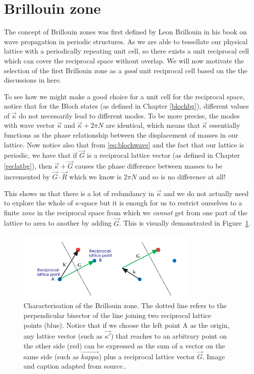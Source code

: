 \section{Brillouin zone}
\label{brizones}

The concept of Brillouin zones was first defined by Leon Brillouin in his book
on wave propagation in periodic structures.\cite{brillouin} As we are able to
tessellate our physical lattice with a periodically repeating unit cell, so
there exists a unit reciprocal cell which can cover the reciprocal space
without overlap. We will now motivate the selection of the first Brillouin zone
as a \textit{good} unit reciprocal cell based on the the discussions in
here.\cite{moldinglight}

To see how we might make a good choice for a unit cell for the reciprocal
space, notice that for the Bloch states (as defined in Chapter \ref{blochbg}),
different values of $\vec{\kappa}$ do not necessarily lead to different modes.
To be more precise, the modes with wave vector $\vec{\kappa}$ and
$\vec{\kappa}+2\pi N$ are identical, which means that $\vec{\kappa}$
essentially functions as the phase relationship between the displacement of
masses in our lattice. Now notice also that from \eqref{eq:blochwave} and the
fact that our lattice is periodic, we have that if $\vec{G}$ is a reciprocal
lattice vector (as defined in Chapter \ref{reclatbg}), then
$\vec{\kappa}+\vec{G}$ causes the phase difference between masses to be
incremented by $\vec{G}\cdot\vec{R}$ which we know is $2\pi N$ and so is no
difference at all!

This shows us that there is a lot of redundancy in $\vec{\kappa}$ and we do not
actually need to explore the whole of $\kappa$-space but it is enough for us to
restrict ourselves to a finite \textit{zone} in the reciprocal space from which
we \textit{cannot} get from one part of the lattice to area to another by
adding $\vec{G}$. This is visually demonstrated in Figure~\ref{fig:kappaspace}.

\begin{figure}[!h]
\centering
\includegraphics[width=0.8\textwidth]{imgs/kappaspace.png}
\caption{\label{fig:kappaspace} Characterisation of the Brillouin zone. The
  dotted line refers to the perpendicular bisector of the line joining two
  reciprocal lattice points (blue). Notice that if we choose the left point A
  as the origin, any lattice vector (such as $\vec{\kappa'}$) that reaches to
  an arbitrary point on the other side (red) can be expressed as the sum of a
  vector on the same side (such as $\vec{kappa}$) plus a reciprocal lattice
  vector $\vec{G}$. Image and caption adapted from source.\cite{moldinglight}.}
\end{figure}

